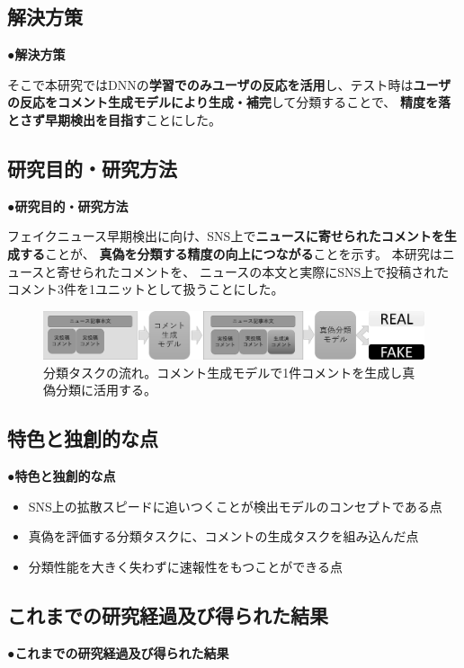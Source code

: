 {	\subsection{解決方策}
	\noindent
	●\textbf{解決方策}

	そこで本研究ではDNNの\textbf{学習でのみユーザの反応を活用}し、テスト時は\textbf{ユーザの反応をコメント生成モデルにより生成・補完}して分類することで、
	\textbf{精度を落とさず早期検出を目指す}ことにした。

	\subsection{研究目的・研究方法}
	\noindent
	●\textbf{研究目的・研究方法}

	フェイクニュース早期検出に向け、SNS上で\textbf{ニュースに寄せられたコメントを生成する}ことが、
	\textbf{真偽を分類する精度の向上につながる}ことを示す。
	本研究はニュースと寄せられたコメントを、
	ニュースの本文と実際にSNS上で投稿されたコメント3件を1ユニットとして扱うことにした。
	
	\begin{figure}[ht]
		\centering
		\includegraphics[width=0.95\linewidth]{figs/model.pdf}
		\caption{分類タスクの流れ。コメント生成モデルで1件コメントを生成し真偽分類に活用する。}
		\label{fig:model}
	\end{figure}

	\subsection{特色と独創的な点}
	\noindent
	●\textbf{特色と独創的な点}
	
	\begin{itemize}
		\item SNS上の拡散スピードに追いつくことが検出モデルのコンセプトである点
		\item 真偽を評価する分類タスクに、コメントの生成タスクを組み込んだ点
		\item 分類性能を大きく失わずに速報性をもつことができる点
	\end{itemize}

	\subsection{これまでの研究経過及び得られた結果}
	\noindent
	●\textbf{これまでの研究経過及び得られた結果}

}
